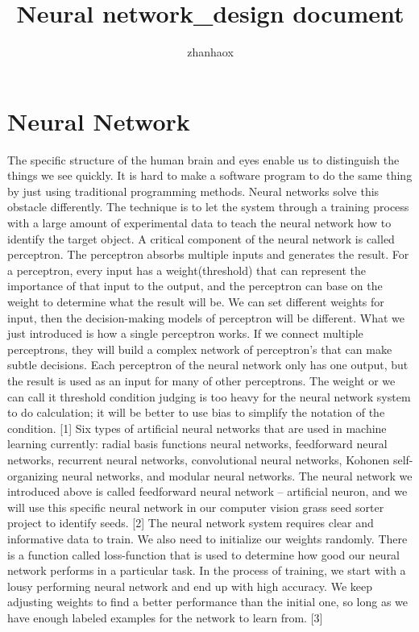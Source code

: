 \documentclass{article}
\title{Neural network_design document}
\author{zhanhaox }
\begin{document}
\maketitle

\section{Neural Network}
The specific structure of the human brain and eyes enable us to distinguish the things we see quickly. It is hard to make a software program to do the same thing by just using traditional programming methods. Neural networks solve this obstacle differently. The technique is to let the system through a training process with a large amount of experimental data to teach the neural network how to identify the target object. A critical component of the neural network is called perceptron. The perceptron absorbs multiple inputs and generates the result. For a perceptron, every input has a weight(threshold) that can represent the importance of that input to the output, and the perceptron can base on the weight to determine what the result will be. We can set different weights for input, then the decision-making models of perceptron will be different. What we just introduced is how a single perceptron works. If we connect multiple perceptrons, they will build a complex network of perceptron's that can make subtle decisions.  Each perceptron of the neural network only has one output, but the result is used as an input for many of other perceptrons. The weight or we can call it threshold condition judging is too heavy for the neural network system to do calculation; it will be better to use bias to simplify the notation of the condition. [1]
Six types of artificial neural networks that are used in machine learning currently: radial basis functions neural networks, feedforward neural networks, recurrent neural networks, convolutional neural networks, Kohonen self-organizing neural networks, and modular neural networks. The neural network we introduced above is called feedforward neural network – artificial neuron, and we will use this specific neural network in our computer vision grass seed sorter project to identify seeds.  [2]
The neural network system requires clear and informative data to train.  We also need to initialize our weights randomly. There is a function called loss-function that is used to determine how good our neural network performs in a particular task. In the process of training, we start with a lousy performing neural network and end up with high accuracy. We keep adjusting weights to find a better performance than the initial one, so long as we have enough labeled examples for the network to learn from.  [3]
\end{document}
